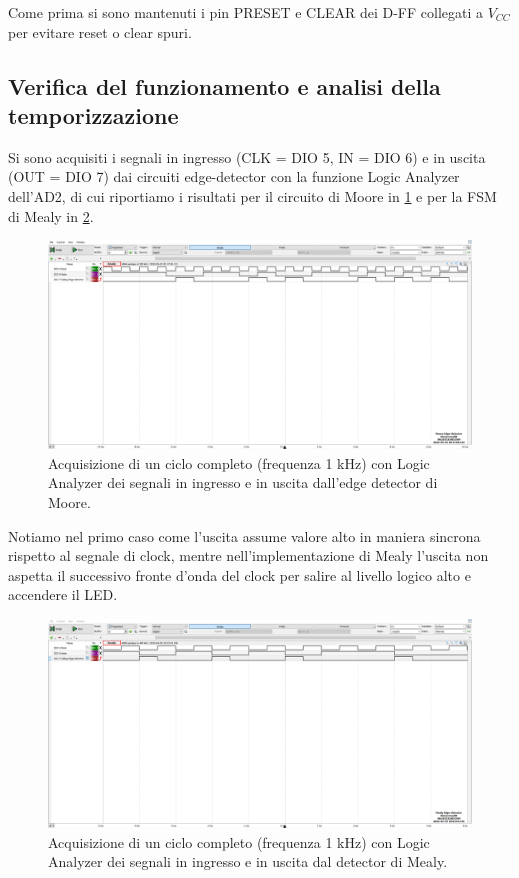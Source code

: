 \documentclass[10pt, a4paper, italian]{article}
\begin{document}
Come prima si sono mantenuti i pin PRESET e CLEAR dei D-FF collegati a
$V_{CC}$ per evitare reset o clear spuri.

\subsection{Verifica del funzionamento e analisi della temporizzazione}
Si sono acquisiti i segnali in ingresso (CLK = DIO 5, IN = DIO 6) e in uscita
(OUT = DIO 7) dai circuiti edge-detector con la funzione Logic Analyzer
dell'AD2, di cui riportiamo i risultati per il circuito di Moore in
\cref{fig: edgeMoore} e per la FSM di Mealy in \cref{fig: edgeMealy}.
\begin{figure}[htbp]
    \centering
    \includegraphics[width=\textwidth]{Moore_edge_detector}
    \caption{Acquisizione di un ciclo completo (frequenza 1 kHz) con Logic
    Analyzer dei segnali in ingresso e in uscita dall'edge detector di Moore.
    \label{fig: edgeMoore}}
\end{figure}
Notiamo nel primo caso come l'uscita assume valore alto in maniera sincrona
rispetto al segnale di clock, mentre nell'implementazione di Mealy l'uscita
non aspetta il successivo fronte d'onda del clock per salire al livello logico
alto e accendere il LED.
\begin{figure}[htbp]
    \centering
    \includegraphics[width=\textwidth]{Mealy_edge_detector}
    \caption{Acquisizione di un ciclo completo (frequenza 1 kHz) con Logic
    Analyzer dei segnali in ingresso e in uscita dal detector di Mealy.
    \label{fig: edgeMealy}}
\end{figure}
\end{document}
